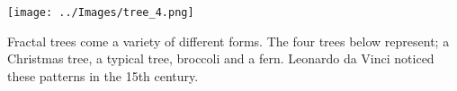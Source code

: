 \documentclass[10pt,a4paper]{article}
\begin{document}
\vspace*{\fill}
\begin{center}
\texttt{[image: ../Images/tree\_4.png]}
\end{center}
\vspace*{\fill}

\begin{center}
\tiny
Fractal trees come a variety of different forms. The four trees below represent; a Christmas tree, a typical tree, broccoli and a fern. Leonardo da Vinci noticed these patterns in the 15th century.
\end{center}
\end{document}
